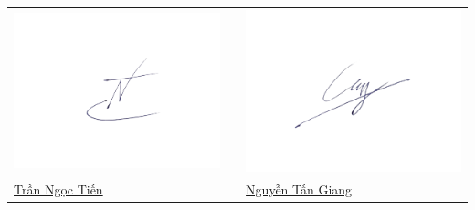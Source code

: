 \documentclass[13pt,a4paper]{article}
\begin{document}
\begin{tabular}{p{}cp{}}

  \includegraphics[width=\linewidth]{TNT.png} & & \includegraphics[width=\linewidth]{Giang.png} \\

  \centering \href { https://www.facebook.com/ngoctien.TNT } { Trần Ngọc Tiến } &  & \centering \href { https://www.facebook.com/SepGiang15th } { Nguyễn Tấn Giang }
\end{tabular} \\
\end{document}
